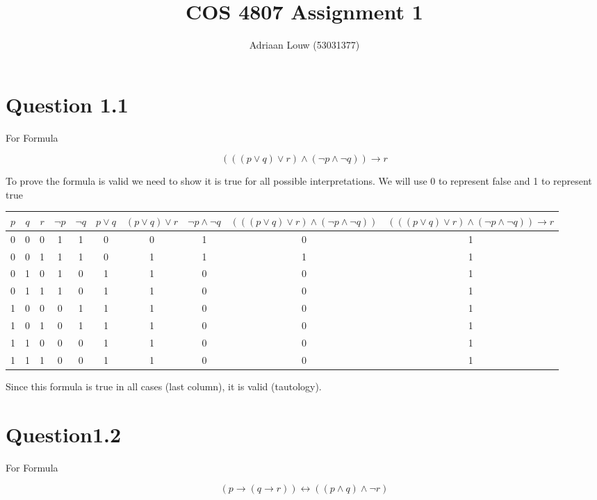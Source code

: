 \documentclass[10pt,a4paper]{article}
\title{COS 4807 Assignment 1}
\author{Adriaan Louw (53031377)}
\begin{document}
\maketitle

\section{Question 1.1}

For Formula


\begin{equation}
 ((( p \vee q) \vee r ) \wedge ( \neg p \wedge \neg q )) \rightarrow r
\end{equation}

To prove the formula is valid we need to show it is true for all possible interpretations. 
We will use 0 to represent false and 1 to represent true

\begin{tabular}{|c|c|c|c|c|c|c|c|c|c|}
\hline
$p$ & $q$ & $r$ & $\neg p$ & $ \neg q$ & $p \vee q$ & $(p \vee q) \vee r$ & $\neg p \wedge \neg q$ &  $((( p \vee q) \vee r ) \wedge ( \neg p \wedge \neg q ))$ & $ ((( p \vee q) \vee r ) \wedge ( \neg p \wedge \neg q )) \rightarrow r$\\ 
\hline
 0 & 0 & 0 & 1 & 1 & 0 & 0 & 1 & 0 & 1\\
 0 & 0 & 1 & 1 & 1 & 0 & 1 & 1 & 1 & 1\\
 0 & 1 & 0 & 1 & 0 & 1 & 1 & 0 & 0 & 1\\
 0 & 1 & 1 & 1 & 0 & 1 & 1 & 0 & 0 & 1\\
 1 & 0 & 0 & 0 & 1 & 1 & 1 & 0 & 0 & 1\\
 1 & 0 & 1 & 0 & 1 & 1 & 1 & 0 & 0 & 1\\
 1 & 1 & 0 & 0 & 0 & 1 & 1 & 0 & 0 & 1\\
 1 & 1 & 1 & 0 & 0 & 1 & 1 & 0 & 0 & 1\\
\hline
\end{tabular}

Since this formula is true in all cases (last column), it is valid (tautology).

\section{Question1.2}

For Formula

\begin{equation}
(p \rightarrow ( q \rightarrow r )) \leftrightarrow (( p \wedge q) \wedge \neg r) 
\end{equation}
\end{document}
